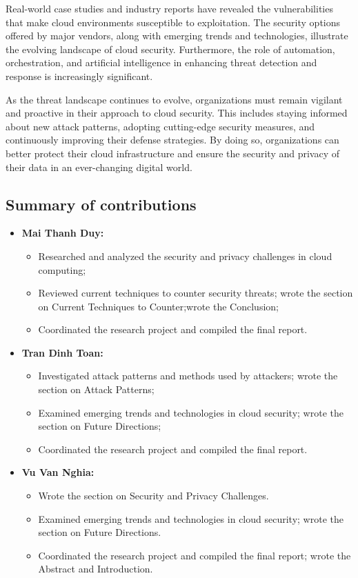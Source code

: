 \documentclass{ijitcs}
\begin{document}
Real-world case studies and industry reports have revealed the vulnerabilities that make cloud environments susceptible to exploitation. The security options offered by major vendors, along with emerging trends and technologies, illustrate the evolving landscape of cloud security. Furthermore, the role of automation, orchestration, and artificial intelligence in enhancing threat detection and response is increasingly significant.

As the threat landscape continues to evolve, organizations must remain vigilant and proactive in their approach to cloud security. This includes staying informed about new attack patterns, adopting cutting-edge security measures, and continuously improving their defense strategies. By doing so, organizations can better protect their cloud infrastructure and ensure the security and privacy of their data in an ever-changing digital world.
\subsection{Summary of contributions}

\begin{itemize}
\item  \textbf{Mai Thanh Duy:} 
\begin{itemize}
\item  Researched and analyzed the security and privacy challenges in cloud computing; 
\item   Reviewed current techniques to counter security threats; wrote the section on Current Techniques to Counter;wrote the Conclusion;
\item    Coordinated the research project and compiled the final report.
\end{itemize}

\item  \textbf{Tran Dinh Toan:} 
\begin{itemize}
\item  Investigated attack patterns and methods used by attackers; wrote the section on Attack Patterns;
\item   Examined emerging trends and technologies in cloud security; wrote the section on Future Directions;
\item    Coordinated the research project and compiled the final report.
\end{itemize}

\item  \textbf{Vu Van Nghia:} 
\begin{itemize}
\item  Wrote the section on Security and Privacy Challenges.
\item   Examined emerging trends and technologies in cloud security; wrote the section on Future Directions.
\item    Coordinated the research project and compiled the final report; wrote the Abstract and Introduction.
\end{itemize}




\end{itemize}
\end{document}
